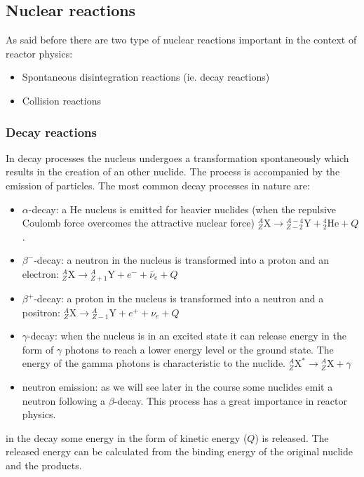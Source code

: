 \subsection{Nuclear reactions}

As said before there are two type of nuclear reactions important in the context of reactor physics:

\begin{itemize}
\item Spontaneous disintegration reactions (ie. decay reactions)
\item Collision reactions
\end{itemize}

\subsubsection{Decay reactions}

In decay processes the nucleus undergoes a transformation spontaneously  which results in the creation of an other nuclide. The process is accompanied by the emission of particles. The most common decay processes in nature are:

\begin{itemize}
\item $\alpha$-decay: a He nucleus is emitted for heavier nuclides (when the repulsive Coulomb force overcomes the attractive nuclear force)  ${}_Z^A\text{X} \rightarrow {}_{Z-2}^{A-4}\text{Y} + {}_2^4\text{He} + Q$.
\item $\beta^-$-decay: a neutron in the nucleus is transformed into a proton and an electron: ${}_Z^A\text{X} \rightarrow {}_{Z+1}^{A}\text{Y} + e^-+\bar\nu_e + Q$
\item $\beta^+$-decay: a proton in the nucleus is transformed into a neutron and a positron: ${}_Z^A\text{X} \rightarrow {}_{Z-1}^{A}\text{Y} + e^{+}+\nu_e + Q$
\item $\gamma$-decay: when the nucleus is in an excited state it can release energy in the form of $\gamma$ photons to reach a lower energy level or the ground state. The energy of the gamma photons is characteristic to the nuclide. ${}_Z^A\text{X}^*\rightarrow {}_Z^A\text{X} + \gamma$
\item neutron emission: as we will see later in the course some nuclides emit a neutron following a $\beta$-decay. This process has a great importance in reactor physics.
\end{itemize}

\noindent in the decay some energy in the form of kinetic energy ($Q$) is released. The released energy can be calculated from the binding energy of the original nuclide and the products.

